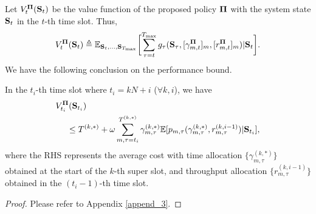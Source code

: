 Let $V^{\mathbf{\Pi}}_{t}(\mathbf{S}_{t})$ be the value function of the proposed policy $\mathbf{\Pi}$ with the system state $\mathbf{S}_{t}$ in the $t$-th time slot. Thus,
\begin{align}
    V^{\Baseline}_{t}(\Stat_{t}) \define  \mathbb{E}_{\Stat_{t},\dots,\Stat_{\T}}
    \Bracket{
        \sum_{\tau=t}^{\T} g_{\tau}\paren{ \Stat_{\tau}, [ \gamma^{\Baseline}_{m,t}]_m, [r^{\Baseline}_{m,t}]_m} | \Stat_{t}
    }.
    \label{eqn:val_baseline}
\end{align}
We have the following conclusion on the performance bound.

\begin{theorem}
    \label{theorem:performance_analysis}
    In the $t_i$-th time slot where $t_i=kN+i$ ($\forall k,i$),
    we have
    \begin{align}
        &V^{\mathbf{\Pi}}_{t_i}(\mathbf{S}_{t_i})
        \nonumber\\
        &~~~~\leq T^{(k,*)} + \omega \sum_{m,\tau=t_i}^{T^{(k,*)}} \gamma^{(k,*)}_{m,\tau} \mathbb{E}[ p_{m,\tau}( \gamma^{(k,*)}_{m,\tau}, r^{(k,i-1)}_{m,\tau} ) | \mathbf{S}_{t_i} ],
        \label{eqn:performance_bound}
    \end{align}
    where the RHS represents the average cost with
    time allocation $\{\gamma^{(k,*)}_{m,\tau}\}$ obtained at the start of the $k$-th super slot, and throughput allocation $\{r^{(k,i-1)}_{m,\tau}\}$ obtained in the $(t_i-1)$-th time slot.
\end{theorem}
\begin{proof}
    Please refer to Appendix \ref{append_3}.
\end{proof}
